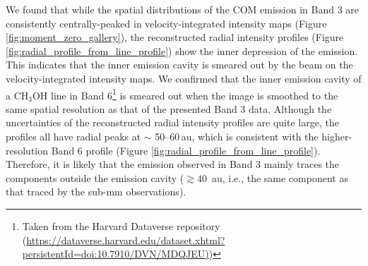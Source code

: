 \documentclass[linenumbers, twocolumn, twocolappendix, astrosymb, times]{aastex631}
\newcommand{\methanol}{CH$_3$OH\xspace}
\begin{document}
We found that while the spatial distributions of the COM emission in Band 3 are consistently centrally-peaked in velocity-integrated intensity maps (Figure \ref{fig:moment_zero_gallery}), the reconstructed radial intensity profiles (Figure \ref{fig:radial_profile_from_line_profile}) show the inner depression of the emission. This indicates that the inner emission cavity is smeared out by the beam on the velocity-integrated intensity maps. We confirmed that the inner emission cavity of a \methanol line in Band 6\footnote{Taken from the Harvard Dataverse repository (\url{https://dataverse.harvard.edu/dataset.xhtml?persistentId=doi:10.7910/DVN/MDQJEU)})} \citep{Tobin2023} is smeared out when the image is smoothed to the same spatial resolution as that of the presented Band 3 data.
Although the uncertainties of the reconstructed radial intensity profiles are quite large, the profiles all have radial peaks at $\sim$ 50--60\,au, which is consistent with the higher-resolution Band 6 profile (Figure \ref{fig:radial_profile_from_line_profile}). Therefore, it is likely that the emission observed in Band 3 mainly traces the components outside the emission cavity ($\gtrsim 40\,$ au, i.e., the same component as that traced by the sub-mm observations). 
\end{document}
